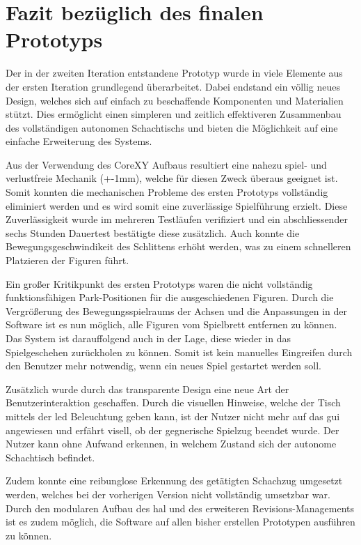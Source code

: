 \hypertarget{fazit-bezuxfcglich-des-finalen-prototyps}{%
\section{Fazit bezüglich des finalen
Prototyps}\label{fazit-bezuxfcglich-des-finalen-prototyps}}

Der in der zweiten Iteration entstandene Prototyp wurde in viele
Elemente aus der ersten Iteration grundlegend überarbeitet. Dabei
endstand ein völlig neues Design, welches sich auf einfach zu
beschaffende Komponenten und Materialien stützt. Dies ermöglicht einen
simpleren und zeitlich effektiveren Zusammenbau des vollständigen
autonomen Schachtischs und bieten die Möglichkeit auf eine einfache
Erweiterung des Systems.

Aus der Verwendung des CoreXY Aufbaus resultiert eine nahezu spiel- und
verlustfreie Mechanik (+-1mm), welche für diesen Zweck überaus geeignet
ist. Somit konnten die mechanischen Probleme des ersten Prototyps
vollständig eliminiert werden und es wird somit eine zuverlässige
Spielführung erzielt. Diese Zuverlässigkeit wurde im mehreren Testläufen
verifiziert und ein abschliessender sechs Stunden Dauertest bestätigte
diese zusätzlich. Auch konnte die Bewegungsgeschwindikeit des Schlittens
erhöht werden, was zu einem schnelleren Platzieren der Figuren führt.

Ein großer Kritikpunkt des ersten Prototyps waren die nicht vollständig
funktionsfähigen Park-Positionen für die ausgeschiedenen Figuren. Durch
die Vergrößerung des Bewegungsspielraums der Achsen und die Anpassungen
in der Software ist es nun möglich, alle Figuren vom Spielbrett
entfernen zu können. Das System ist darauffolgend auch in der Lage,
diese wieder in das Spielgeschehen zurückholen zu können. Somit ist kein
manuelles Eingreifen durch den Benutzer mehr notwendig, wenn ein neues
Spiel gestartet werden soll.

Zusätzlich wurde durch das transparente Design eine neue Art der
Benutzerinteraktion geschaffen. Durch die visuellen Hinweise, welche der
Tisch mittels der \gls{led} Beleuchtung geben kann, ist der Nutzer nicht
mehr auf das \gls{gui} angewiesen und erfährt visell, ob der gegnerische
Spielzug beendet wurde. Der Nutzer kann ohne Aufwand erkennen, in
welchem Zustand sich der autonome Schachtisch befindet.

Zudem konnte eine reibunglose Erkennung des getätigten Schachzug
umgesetzt werden, welches bei der vorherigen Version nicht vollständig
umsetzbar war. Durch den modularen Aufbau des \gls{hal} und des
erweiteren Revisions-Managements ist es zudem möglich, die Software auf
allen bisher erstellen Prototypen ausführen zu können.

